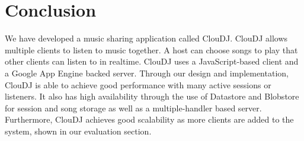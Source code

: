 \section{Conclusion}
    \label{sec:conc}
We have developed a music sharing application called ClouDJ.
ClouDJ allows multiple clients to listen to music together. A host
can choose songs to play that other clients can listen to in
realtime. ClouDJ uses a JavaScript-based client and a Google App Engine
backed server. Through our design and implementation, ClouDJ
is able to achieve good performance with many active sessions
or listeners. It also has high availability through the use of Datastore and
Blobstore for session and song storage as well as a multiple-handler based server.
Furthermore, ClouDJ achieves good scalability as more clients are added to the system,
shown in our evaluation section.